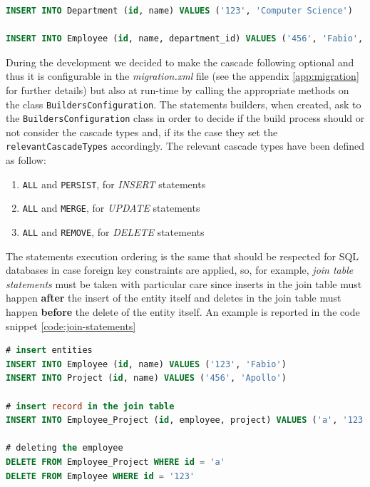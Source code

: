 \begin{lstlisting}[language=SQL, caption=Statements ordering example, label=code:statements-ordering]
INSERT INTO Department (id, name) VALUES ('123', 'Computer Science')

INSERT INTO Employee (id, name, department_id) VALUES ('456', 'Fabio', '123')
\end{lstlisting}

\noindent During the development we decided to make the cascade following optional and thus it is configurable in the \textit{migration.xml} file (see the appendix \ref{app:migration} for further details) but also at run-time by calling the appropriate methods on the class \texttt{BuildersConfiguration}. The statements builders, when created, ask to the \texttt{BuildersConfiguration} class in order to decide if the build process should or not consider the cascade types and, if its the case they set the \texttt{relevantCascadeTypes} accordingly.
The relevant cascade types have been defined as follow:
\begin{enumerate}
\item \texttt{ALL} and \texttt{PERSIST}, for \textit{INSERT} statements
\item \texttt{ALL} and \texttt{MERGE}, for \textit{UPDATE} statements
\item \texttt{ALL} and \texttt{REMOVE}, for \textit{DELETE} statements
\end{enumerate}
\noindent The statements execution ordering is the same that should be respected for SQL databases in case foreign key constraints are applied, so, for example, \textit{join table statements} must be taken with particular care since inserts in the join table must happen \textbf{after} the insert of the entity itself and deletes in the join table must happen \textbf{before} the delete of the entity itself. An example is reported in the code snippet \ref{code:join-statements}

\begin{lstlisting}[language=SQL, caption=Join table statements ordering example, label=code:join-statements]
# insert entities
INSERT INTO Employee (id, name) VALUES ('123', 'Fabio')
INSERT INTO Project (id, name) VALUES ('456', 'Apollo')

# insert record in the join table
INSERT INTO Employee_Project (id, employee, project) VALUES ('a', '123', '456')

# deleting the employee
DELETE FROM Employee_Project WHERE id = 'a'
DELETE FROM Employee WHERE id = '123'
\end{lstlisting}

